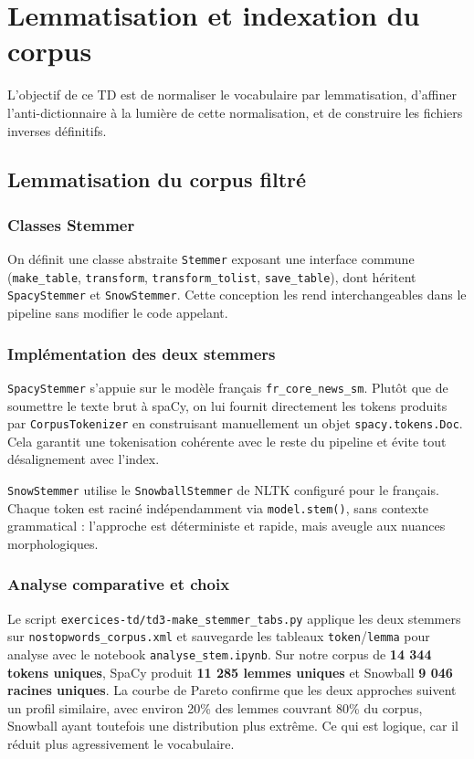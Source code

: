 \chapter{Lemmatisation et indexation du corpus}

L'objectif de ce TD est de normaliser le vocabulaire par lemmatisation, d'affiner l'anti-dictionnaire à la lumière de cette normalisation, et de construire les fichiers inverses définitifs.

\section{Lemmatisation du corpus filtré}

\subsection{Classes Stemmer}

On définit une classe abstraite \texttt{Stemmer} exposant une interface commune (\texttt{make\_table}, \texttt{transform}, \texttt{transform\_tolist}, \texttt{save\_table}), dont héritent \texttt{SpacyStemmer} et \texttt{SnowStemmer}. Cette conception les rend interchangeables dans le pipeline sans modifier le code appelant.

\subsection{Implémentation des deux stemmers}

\texttt{SpacyStemmer} s'appuie sur le modèle français \texttt{fr\_core\_news\_sm}. Plutôt que de soumettre le texte brut à spaCy, on lui fournit directement les tokens produits par \texttt{CorpusTokenizer} en construisant manuellement un objet \texttt{spacy.tokens.Doc}. Cela garantit une tokenisation cohérente avec le reste du pipeline et évite tout désalignement avec l'index.

\texttt{SnowStemmer} utilise le \texttt{SnowballStemmer} de NLTK configuré pour le français. Chaque token est raciné indépendamment via \texttt{model.stem()}, sans contexte grammatical : l'approche est déterministe et rapide, mais aveugle aux nuances morphologiques.

\subsection{Analyse comparative et choix}

Le script \texttt{exercices-td/td3-make\_stemmer\_tabs.py} applique les deux stemmers sur \texttt{nostopwords\_corpus.xml} et sauvegarde les tableaux \texttt{token}/\texttt{lemma} pour analyse avec le notebook \texttt{analyse\_stem.ipynb}. Sur notre corpus de \textbf{14 344 tokens uniques}, SpaCy produit \textbf{11 285 lemmes uniques} et Snowball \textbf{9 046 racines uniques}. La courbe de Pareto confirme que les deux approches suivent un profil similaire, avec environ 20\% des lemmes couvrant 80\% du corpus, Snowball ayant toutefois une distribution plus extrême. Ce qui est logique, car il réduit plus agressivement le vocabulaire.

